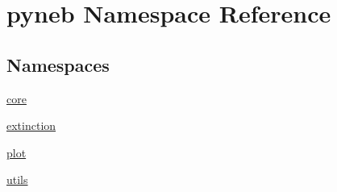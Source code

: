 \hypertarget{namespacepyneb}{}\section{pyneb Namespace Reference}
\label{namespacepyneb}
\subsection*{Namespaces}
\begin{DoxyCompactItemize}
\item 
 \hyperlink{namespacepyneb_1_1core}{core}
\item 
 \hyperlink{namespacepyneb_1_1extinction}{extinction}
\item 
 \hyperlink{namespacepyneb_1_1plot}{plot}
\item 
 \hyperlink{namespacepyneb_1_1utils}{utils}
\end{DoxyCompactItemize}
